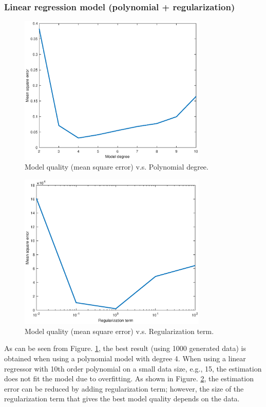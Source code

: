 \documentclass[]{article}
\begin{document}
\subsubsection{Linear regression model (polynomial + regularization)}
\begin{figure}[H]
	\caption{Model quality (mean square error) v.s. Polynomial degree.}
	\label{fig:5thorderpolynomial}
	\centering
	\includegraphics[width=0.8\textwidth]{project32b}
\end{figure}

\begin{figure}[H]
	\caption{Model quality (mean square error) v.s. Regularization term.}
	\label{fig:regularization}
	\centering
	\includegraphics[width=0.8\textwidth]{project32b2}
\end{figure}

As can be seen from Figure. \ref{fig:5thorderpolynomial}, the best result (using 1000 generated data) is obtained when using a polynomial model with degree 4. When using a linear regressor with 10th order polynomial on a small data size, e.g., 15, the estimation does not fit the model due to overfitting. As shown in Figure. \ref{fig:regularization}, the estimation error can be reduced by adding regularization term; however, the size of the regularization term that gives the best model quality depends on the data.
\end{document}
